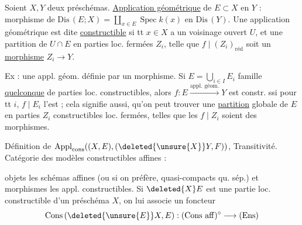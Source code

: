Soient $X,Y$ deux préschémas. \uline{Application géométrique} de $E\subset X$ en $Y$ : morphisme de $\mathrm{Dis}\,(E;X)=\coprod_{x\in E}\operatorname{Spec}k(x)$ en $\mathrm{Dis}\,(Y)$.  Une application géométrique est dite \uline{constructible} si tt $x\in X$ a un voisinage ouvert  $U$, et une partition de $U\cap E$ en parties loc. fermées $Z_i$, telle que $f\mid(Z_i)_{\mathrm{réd}}$ soit un \uline{morphisme} $Z_i\longrightarrow Y$. 

Ex : une appl. géom. définie par un morphisme. Si  $E=\bigcup_{i\in I}E_i$ famille \uline{quelconque} de parties loc. constructibles, alors $f:E\xrightarrow{\text{appl. géom.}}Y$ est constr. ssi pour tt $i$, $f\mid E_i$ l'est ; cela signifie aussi,  qu'on peut trouver une \uline{partition} globale de $E$ en parties $Z_i$ constructibles loc. fermées, telles que les $f\mid Z_i$ soient des morphismes.

Définition de $\operatorname{Appl}_{\mathrm{cons}}((X,E),(\deleted{\unsure{X}}Y,F))$, Transitivité. Catégorie  des modèles constructibles affines :

objets les schémas affines (ou si on préfère, quasi-compacts qu. sép.) et morphismes les appl. constructibles. Si $\deleted{X}E$ est une partie loc.  constructible d'un préschéma $X$, on lui associe un foncteur
\[
\mathrm{Cons}\,(\deleted{\unsure{E}}X,E):(\mathrm{Cons}\ \mathrm{aff})^{\circ}\longrightarrow(\mathrm{Ens})
\]
